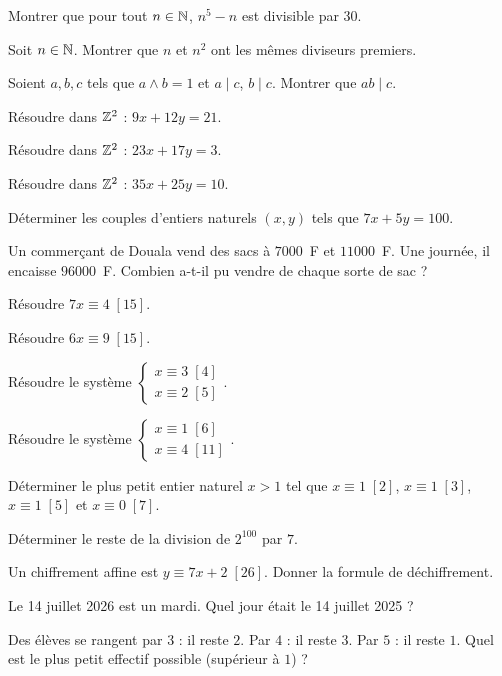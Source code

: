 \exo{} Montrer que pour tout $n\in\mathbb{N}$, $n^5-n$ est divisible par $30$.

\exo{} Soit $n\in\mathbb{N}$. Montrer que $n$ et $n^2$ ont les mêmes diviseurs premiers.

\exo{} Soient $a,b,c$ tels que $a\wedge b=1$ et $a\mid c$, $b\mid c$. Montrer que $ab\mid c$.

\exo{} Résoudre dans $\mathbb{Z}^2$ : $9x+12y=21$.

\exo{} Résoudre dans $\mathbb{Z}^2$ : $23x+17y=3$.

\exo{} Résoudre dans $\mathbb{Z}^2$ : $35x+25y=10$.

\exo{} Déterminer les couples d'entiers naturels $(x,y)$ tels que $7x+5y=100$.

\exo{} Un commerçant de Douala vend des sacs à $7000$~F et $11000$~F. Une journée, il encaisse $96000$~F. Combien a-t-il pu vendre de chaque sorte de sac ?

\exo{} Résoudre $7x\equiv4\;[15]$.

\exo{} Résoudre $6x\equiv9\;[15]$.

\exo{} Résoudre le système $\begin{cases}x\equiv3\;[4]\\ x\equiv2\;[5]\end{cases}$.

\exo{} Résoudre le système $\begin{cases}x\equiv1\;[6]\\ x\equiv4\;[11]\end{cases}$.

\exo{} Déterminer le plus petit entier naturel $x>1$ tel que $x\equiv1\;[2]$, $x\equiv1\;[3]$, $x\equiv1\;[5]$ et $x\equiv0\;[7]$.

\exo{} Déterminer le reste de la division de $2^{100}$ par $7$.

\exo{} Un chiffrement affine est $y\equiv7x+2\;[26]$. Donner la formule de déchiffrement.

\exo{} Le 14 juillet 2026 est un mardi. Quel jour était le 14 juillet 2025 ?

\exo{} Des élèves se rangent par $3$ : il reste $2$. Par $4$ : il reste $3$. Par $5$ : il reste $1$. Quel est le plus petit effectif possible (supérieur à $1$) ?

